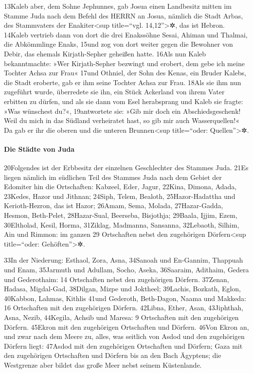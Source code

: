 13Kaleb aber, dem Sohne Jephunnes, gab Josua einen Landbesitz mitten im
Stamme Juda nach dem Befehl des HERRN an Josua, nämlich die Stadt Arbas,
des Stammvaters der Enakiter\textless sup title=``vgl.
14,12''\textgreater✲, das ist Hebron. 14Kaleb vertrieb dann von dort die
drei Enakssöhne Sesai, Ahiman und Thalmai, die Abkömmlinge Enaks, 15und
zog von dort weiter gegen die Bewohner von Debir, das ehemals
Kirjath-Sepher geheißen hatte. 16Als nun Kaleb bekanntmachte: »Wer
Kirjath-Sepher bezwingt und erobert, dem gebe ich meine Tochter Achsa
zur Frau« 17und Othniel, der Sohn des Kenas, ein Bruder Kalebs, die
Stadt eroberte, gab er ihm seine Tochter Achsa zur Frau. 18Als sie ihm
nun zugeführt wurde, überredete sie ihn, ein Stück Ackerland von ihrem
Vater erbitten zu dürfen, und als sie dann vom Esel herabsprang und
Kaleb sie fragte: »Was wünschest du?«, 19antwortete sie: »Gib mir doch
ein Abschiedsgeschenk! Weil du mich in das Südland verheiratet hast, so
gib mir auch Wasserquellen!« Da gab er ihr die oberen und die unteren
Brunnen\textless sup title=``oder: Quellen''\textgreater✲.

\hypertarget{die-stuxe4dte-von-juda}{%
\paragraph{Die Städte von Juda}\label{die-stuxe4dte-von-juda}}

20Folgendes ist der Erbbesitz der einzelnen Geschlechter des Stammes
Juda. 21Es liegen nämlich im südlichen Teil des Stammes Juda nach dem
Gebiet der Edomiter hin die Ortschaften: Kabzeel, Eder, Jagur, 22Kina,
Dimona, Adada, 23Kedes, Hazor und Jithnan; 24Siph, Telem, Bealoth,
25Hazor-Hadattha und Kerioth-Hezron, das ist Hazor; 26Amam, Sema,
Molada, 27Hazar-Gadda, Hesmon, Beth-Pelet, 28Hazar-Sual, Beerseba,
Bisjothja; 29Baala, Ijjim, Ezem, 30Eltholad, Kesil, Horma, 31Ziklag,
Madmanna, Sansanna, 32Lebaoth, Silhim, Ain und Rimmon: im ganzen 29
Ortschaften nebst den zugehörigen Dörfern\textless sup title=``oder:
Gehöften''\textgreater✲.

33In der Niederung: Esthaol, Zora, Asna, 34Sanoah und En-Gannim,
Thappuah und Enam, 35Jarmuth und Adullam, Socho, Aseka, 36Saaraim,
Adithaim, Gedera und Gederothaim: 14 Ortschaften nebst den zugehörigen
Dörfern. 37Zenan, Hadasa, Migdal-Gad, 38Dilgan, Mizpe und Joktheel;
39Lachis, Bozkath, Eglon, 40Kabbon, Lahmas, Kithlis 41und Gederoth,
Beth-Dagon, Naama und Makkeda: 16 Ortschaften mit den zugehörigen
Dörfern. 42Libna, Ether, Asan, 43Jiphthah, Asna, Nezib, 44Kegila, Achsib
und Maresa: 9 Ortschaften mit den zugehörigen Dörfern. 45Ekron mit den
zugehörigen Ortschaften und Dörfern. 46Von Ekron an, und zwar nach dem
Meere zu, alles, was seitlich von Asdod und den zugehörigen Dörfern
liegt: 47Asdod mit den zugehörigen Ortschaften und Dörfern; Gaza mit den
zugehörigen Ortschaften und Dörfern bis an den Bach Ägyptens; die
Westgrenze aber bildet das große Meer nebst seinem Küstenlande.

